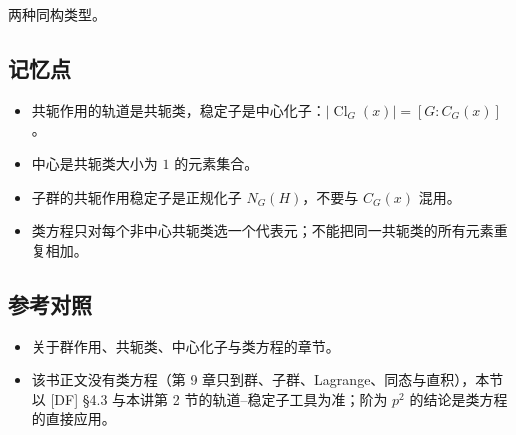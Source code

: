 两种同构类型。

\subsection{记忆点}


\begin{itemize}
\item 共轭作用的轨道是共轭类，稳定子是中心化子：$|\operatorname{Cl}_G(x)|=[G:C_G(x)]$。
\item 中心是共轭类大小为 $1$ 的元素集合。
\item 子群的共轭作用稳定子是正规化子 $N_G(H)$，不要与 $C_G(x)$ 混用。
\item 类方程只对每个非中心共轭类选一个代表元；不能把同一共轭类的所有元素重复相加。
\end{itemize}


\subsection{参考对照}


\begin{itemize}
\item [DF] 关于群作用、共轭类、中心化子与类方程的章节。
\item [DS] 该书正文没有类方程（第 9 章只到群、子群、Lagrange、同态与直积），本节以 [DF] §4.3 与本讲第 2 节的轨道--稳定子工具为准；阶为 $p^2$ 的结论是类方程的直接应用。
\end{itemize}
